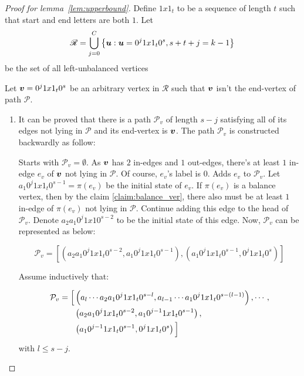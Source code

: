 \begin{proof}[Proof for lemma~\ref{lem:upperbound}]
    Define $1x1_{t}$ to be a sequence of length $t$ such that start and end letters are both $1$. Let $$\mathscr{R}=\bigcup_{j=0}^{C}\left\{{\boldsymbol u}:{\boldsymbol u}=0^{j}1x1_{t}0^{s},s+t+j=k-1\right\}$$ be the set of all left-unbalanced vertices
    
    Let ${\boldsymbol v}=0^{j}1x1_{t}0^{s}$ be an arbitrary vertex in $\mathscr{R}$ such that ${\boldsymbol v}$ isn't the end-vertex of path $\mathscr{P}$. 
    
    \begin{enumerate}
        \item It can be proved that there is a path $\mathcal{P}_{v}$ of length $s-j$ satisfying all of its edges not lying in $\mathscr{P}$ and its end-vertex is ${\boldsymbol v}$.
            The path $\mathcal{P}_{v}$ is constructed backwardly as follow:
            
            Starts with $\mathcal{P}_{v}=\emptyset$. As ${\boldsymbol v}$ has $2$ in-edges and $1$ out-edges, there's at least $1$ in-edge $e_{v}$ of ${\boldsymbol v}$ not lying in $\mathscr{P}$. Of course, $e_{v}$'s label is $0$. Adds $e_{v}$ to $\mathscr{P}_{v}$. Let $a_{1}0^{j}1x1_{t}0^{s-1}= \pi(e_{v})$ be the initial state of $e_{v}$. If $\pi(e_{v})$ is a balance vertex, then by the claim \ref{claim:balance_ver}, there also must be at least $1$ in-edge of $\pi(e_{v})$ not lying in $\mathscr{P}$. Continue adding this edge to the head of $\mathcal{P}_{v}$. Denote $a_{2}a_{1}0^{j}1x10^{s-2}$ to be the initial state of this edge. Now, $\mathcal{P}_{v}$ can be represented as below:
            
            \[\mathcal{P}_{v}=\left[\left(a_{2}a_{1}0^{j}1x1_{t}0^{s-2},a_{1}0^{j}1x1_{t}0^{s-1}\right), \left(a_{1}0^{j}1x1_{t}0^{s-1},0^{j}1x1_{t}0^{s}\right)\right]\]
            
            Assume inductively that:
            
            \begin{align*}
                \mathcal{P}_{v}= \Bigl[&\left(a_{l}\cdots a_{2}a_{1}0^{j}1x1_{t}0^{s-l},a_{l-1}\cdots a_{1}0^{j}1x1_{t}0^{s-(l-1)}\right),\cdots,\\
                &\left(a_{2}a_{1}0^{j}1x1_{t}0^{s-2}, a_{1}0^{j-1}1x1_{t}0^{s-1}\right),\\
                &\left(a_{1}0^{j-1}1x1_{t}0^{s-1},0^{j}1x1_{t}0^{s}\right)\Bigl]   
            \end{align*}
            with $l\leq s-j$.
            

\end{enumerate}
\end{proof}
